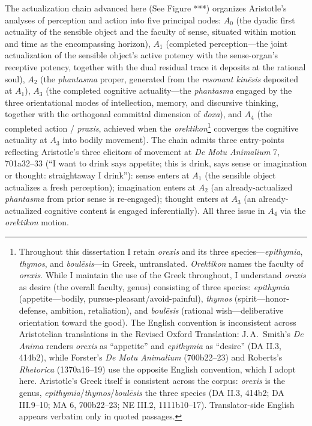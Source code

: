 The actualization chain advanced here (See Figure ***) organizes Aristotle's analyses of perception and action into five principal nodes: $A_0$ (the dyadic first actuality of the sensible object and the faculty of sense, situated within motion and time as the encompassing horizon), $A_1$ (completed perception---the joint actualization of the sensible object's active potency with the sense-organ's receptive potency, together with the dual residual trace it deposits at the rational soul), $A_2$ (the \textit{phantasma} proper, generated from the \textit{resonant kinēsis} deposited at $A_1$), $A_3$ (the completed cognitive actuality---the \textit{phantasma} engaged by the three orientational modes of intellection, memory, and discursive thinking, together with the orthogonal committal dimension of \textit{doxa}), and $A_4$ (the completed action / \textit{praxis}, achieved when the \textit{orektikon}\footnote{Throughout this dissertation I retain \textit{orexis} and its three species---\textit{epithymia}, \textit{thymos}, and \textit{boulēsis}---in Greek, untranslated. \textit{Orektikon} names the faculty of \textit{orexis}. While I maintain the use of the Greek throughout, I understand \textit{orexis} as desire (the overall faculty, genus) consisting of three species: \textit{epithymia} (appetite---bodily, pursue-pleasant/avoid-painful), \textit{thymos} (spirit---honor-defense, ambition, retaliation), and \textit{boulēsis} (rational wish---deliberative orientation toward the good). The English convention is inconsistent across Aristotelian translations in the Revised Oxford Translation: J.\,A.\ Smith's \textit{De Anima} renders \textit{orexis} as ``appetite'' and \textit{epithymia} as ``desire'' (DA II.3, 414b2), while Forster's \textit{De Motu Animalium} (700b22--23) and Roberts's \textit{Rhetorica} (1370a16--19) use the opposite English convention, which I adopt here. Aristotle's Greek itself is consistent across the corpus: \textit{orexis} is the genus, \textit{epithymia}/\textit{thymos}/\textit{boulēsis} the three species (DA II.3, 414b2; DA III.9--10; MA 6, 700b22--23; NE III.2, 1111b10--17). Translator-side English appears verbatim only in quoted passages.} converges the cognitive actuality at $A_3$ into bodily movement). The chain admits three entry-points reflecting Aristotle's three elicitors of movement at \textit{De Motu Animalium} 7, 701a32--33 (``I want to drink says appetite; this is drink, says sense or imagination or thought: straightaway I drink''): sense enters at $A_1$ (the sensible object actualizes a fresh perception); imagination enters at $A_2$ (an already-actualized \textit{phantasma} from prior sense is re-engaged); thought enters at $A_3$ (an already-actualized cognitive content is engaged inferentially). All three issue in $A_4$ via the \textit{orektikon} motion. 

